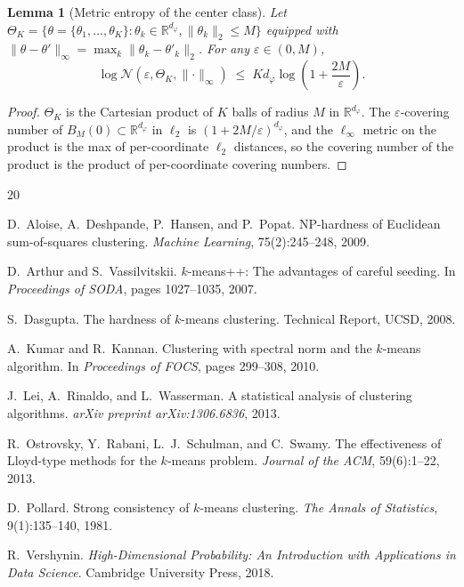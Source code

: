 \documentclass[twoside]{article}
\theoremstyle{plain}
\newtheorem{lemma}[theorem]{Lemma}
\theoremstyle{definition}
\theoremstyle{remark}
\newcommand{\R}{\mathbb{R}}
\newcommand{\1}{\mathbf{1}}
\renewcommand{\epsilon}{\varepsilon}
\renewcommand{\phi}{\varphi}
\newcommand{\norm}[1]{\lVert#1\rVert}
\begin{document}
\begin{lemma}[Metric entropy of the center class]
\label{lem:S5:covering}
Let $\Theta_K=\{\theta=\{\theta_1,\dots,\theta_K\}:\theta_k\in\R^{d_\phi},
\norm{\theta_k}_2\le M\}$ equipped with
$\norm{\theta-\theta'}_\infty=\max_k\norm{\theta_k-\theta'_k}_2$.
For any $\epsilon\in(0,M)$,
\[
\log\mathcal{N}(\epsilon,\Theta_K,\norm{\cdot}_\infty)
\;\le\; K d_\phi\log\!\left(1+\frac{2M}{\epsilon}\right).
\]
\end{lemma}

\begin{proof}
$\Theta_K$ is the Cartesian product of $K$ balls of radius $M$ in
$\R^{d_\phi}$.  The $\epsilon$-covering number of $B_M(0)\subset\R^{d_\phi}$
in $\ell_2$ is $(1+2M/\epsilon)^{d_\phi}$, and the $\ell_\infty$ metric
on the product is the max of per-coordinate $\ell_2$ distances, so the
covering number of the product is the product of per-coordinate covering
numbers.
\end{proof}

\begin{thebibliography}{20}

D.~Aloise, A.~Deshpande, P.~Hansen, and P.~Popat.
NP-hardness of Euclidean sum-of-squares clustering.
\emph{Machine Learning}, 75(2):245--248, 2009.

D.~Arthur and S.~Vassilvitskii.
$k$-means++: The advantages of careful seeding.
In \emph{Proceedings of SODA}, pages 1027--1035, 2007.

S.~Dasgupta.
The hardness of $k$-means clustering.
Technical Report, UCSD, 2008.

A.~Kumar and R.~Kannan.
Clustering with spectral norm and the $k$-means algorithm.
In \emph{Proceedings of FOCS}, pages 299--308, 2010.

J.~Lei, A.~Rinaldo, and L.~Wasserman.
A statistical analysis of clustering algorithms.
\emph{arXiv preprint arXiv:1306.6836}, 2013.

R.~Ostrovsky, Y.~Rabani, L.~J.~Schulman, and C.~Swamy.
The effectiveness of Lloyd-type methods for the $k$-means problem.
\emph{Journal of the ACM}, 59(6):1--22, 2013.

D.~Pollard.
Strong consistency of $k$-means clustering.
\emph{The Annals of Statistics}, 9(1):135--140, 1981.

R.~Vershynin.
\emph{High-Dimensional Probability: An Introduction with Applications in
Data Science}. Cambridge University Press, 2018.

\end{thebibliography}
\end{document}
